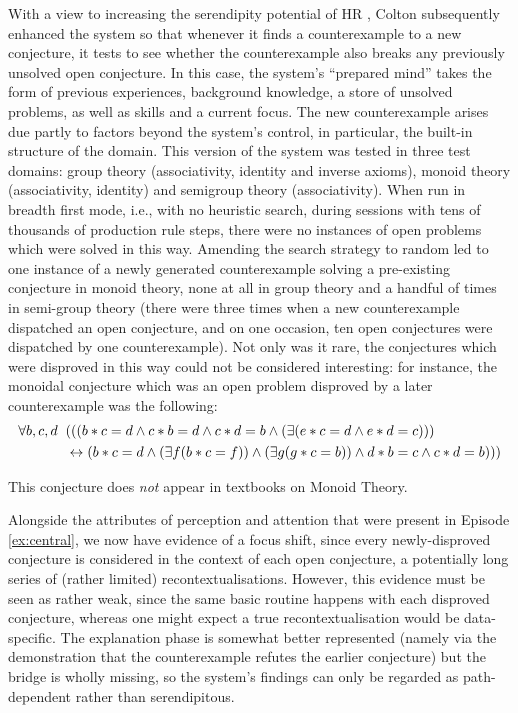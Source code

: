 \begin{ep}\label{ex:monoid}
With a view to increasing the serendipity potential of {\sf HR} , Colton 
subsequently enhanced the system so that whenever it finds a
counterexample to a new conjecture, it tests to see whether the
counterexample also breaks any previously unsolved open conjecture.
In this case, the system's ``prepared mind'' takes the form of previous
experiences, background knowledge, a store of unsolved problems, as
well as skills and a current focus.  The new counterexample arises
due partly to factors beyond the system's control, in particular, the
built-in structure of the
domain.
This version of the system was tested in three test domains:  group theory (associativity, identity and inverse axioms), monoid theory (associativity, identity) and semigroup theory (associativity). When run in breadth first mode, i.e., with no heuristic search, during sessions with tens of thousands of production rule steps, there were no instances of open problems which were solved in this way. Amending the search strategy to random led to one instance of a newly generated counterexample solving a pre-existing conjecture in monoid theory, none at all in group theory and a handful of times in semi-group theory (there were three times when a new counterexample dispatched an open conjecture, and on one occasion, ten open conjectures were dispatched by one counterexample).  Not only was it rare, the conjectures which were disproved in this way could not be considered interesting: for instance, the monoidal conjecture which was an open problem disproved by a later counterexample was the following:
\begin{align*}
\forall b, c, d &\hspace{.2cm}(((b * c = d \wedge c * b = d \wedge c * d = b \wedge (\exists(e * c = d \wedge e * d = c)))\\
&\hspace{.2cm}\leftrightarrow(b * c = d \wedge (\exists f(b * c = f)) \wedge (\exists g(g * c = b)) \wedge d * b = c \wedge c * d = b)))
\end{align*}

\noindent This conjecture does {\em not} appear in textbooks on Monoid Theory.
\end{ep}

Alongside the attributes of perception and attention that were present
in Episode \ref{ex:central}, we now have evidence of a focus shift,
since every newly-disproved conjecture is considered in the context of
each open conjecture, a potentially long series of (rather limited)
recontextualisations.  However, this evidence must be seen as rather
weak, since the same basic routine happens with each disproved
conjecture, whereas one might expect a true recontextualisation would
be data-specific.
The explanation phase is somewhat better represented (namely via the
demonstration that the counterexample refutes the earlier conjecture)
but the bridge is wholly missing, so the system's findings can only be
regarded as path-dependent rather than serendipitous.

